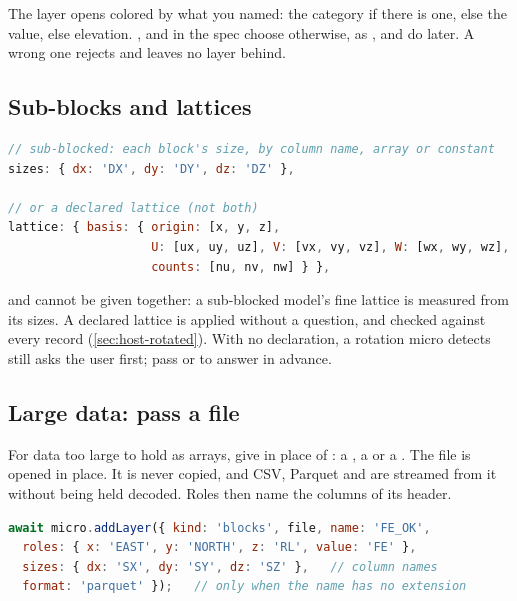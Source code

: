 The layer opens colored by what you named: the category if there is one, else the value, else
elevation. ,  and  in the spec choose otherwise, as
,  and  do later. A wrong one rejects and
leaves no layer behind.

\subsection{Sub-blocks and lattices}

\begin{lstlisting}[language=js]
// sub-blocked: each block's size, by column name, array or constant
sizes: { dx: 'DX', dy: 'DY', dz: 'DZ' },

// or a declared lattice (not both)
lattice: { basis: { origin: [x, y, z],
                    U: [ux, uy, uz], V: [vx, vy, vz], W: [wx, wy, wz],
                    counts: [nu, nv, nw] } },
\end{lstlisting}

 and  cannot be given together: a sub-blocked model's fine lattice is
measured from its sizes. A declared lattice is applied without a question, and checked against
every record (\cref{sec:host-rotated}). With no declaration, a rotation micro detects still asks
the user first; pass  or  to answer in advance.

\subsection{Large data: pass a file}

For data too large to hold as arrays, give  in place of : a ,
a  or a . The file is opened in place. It is never copied,
and CSV, Parquet and  are streamed from it without being held decoded. Roles then name
the columns of its header.

\begin{lstlisting}[language=js]
await micro.addLayer({ kind: 'blocks', file, name: 'FE_OK',
  roles: { x: 'EAST', y: 'NORTH', z: 'RL', value: 'FE' },
  sizes: { dx: 'SX', dy: 'SY', dz: 'SZ' },   // column names
  format: 'parquet' });   // only when the name has no extension
\end{lstlisting}

